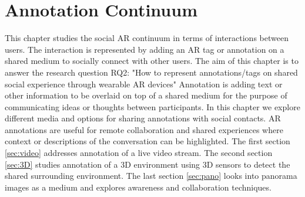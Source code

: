 \chapter{Annotation Continuum} %
\label{ch:annotation} %

This chapter studies the social AR continuum in terms of interactions between users. The interaction is represented by adding an AR tag or annotation on a shared medium to socially connect with other users. 
The aim of this chapter is to answer the research question RQ2: "How to represent annotations/tags on shared social experience through wearable AR devices"
Annotation is adding text or other information to be overlaid on top of a shared medium for the purpose of communicating ideas or thoughts between participants. In this chapter we explore different media and options for sharing annotations with social contacts. AR annotations are useful for remote collaboration and shared experiences where context or descriptions of the conversation can be highlighted.  
The first section \ref{sec:video} addresses annotation of a live video stream. The second section \ref{sec:3D} studies annotation of a 3D environment using 3D sensors to detect the shared surrounding environment. The last section \ref{sec:pano} looks into panorama images as a medium and explores awareness and collaboration techniques. 






